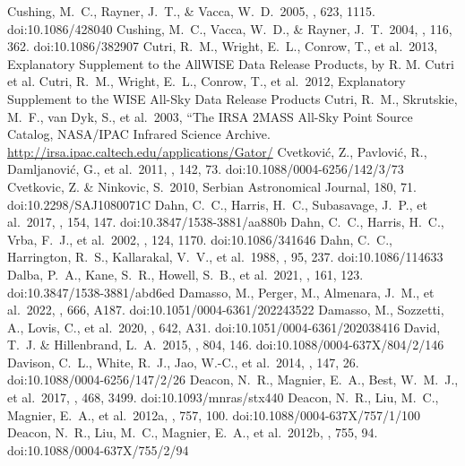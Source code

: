 \documentclass[twocolumn,tighten,twocolappendix]{aastex631}
\begin{document}
\begin{thebibliography}{}
 Cushing, M.~C., Rayner, J.~T., \& Vacca, W.~D.\ 2005, \apj, 623, 1115. doi:10.1086/428040
 Cushing, M.~C., Vacca, W.~D., \& Rayner, J.~T.\ 2004, \pasp, 116, 362. doi:10.1086/382907
 Cutri, R.~M., Wright, E.~L., Conrow, T., et al.\ 2013, Explanatory Supplement to the AllWISE Data Release Products, by R. M. Cutri et al.
 Cutri, R.~M., Wright, E.~L., Conrow, T., et al.\ 2012, Explanatory Supplement to the WISE All-Sky Data Release Products
 Cutri, R.~M., Skrutskie, M.~F., van Dyk, S., et al.\ 2003, ``The IRSA 2MASS All-Sky Point Source Catalog, NASA/IPAC Infrared Science Archive. \url{http://irsa.ipac.caltech.edu/applications/Gator/}
 Cvetkovi{\'c}, Z., Pavlovi{\'c}, R., Damljanovi{\'c}, G., et al.\ 2011, \aj, 142, 73. doi:10.1088/0004-6256/142/3/73
 Cvetkovic, Z. \& Ninkovic, S.\ 2010, Serbian Astronomical Journal, 180, 71. doi:10.2298/SAJ1080071C
 Dahn, C.~C., Harris, H.~C., Subasavage, J.~P., et al.\ 2017, \aj, 154, 147. doi:10.3847/1538-3881/aa880b
 Dahn, C.~C., Harris, H.~C., Vrba, F.~J., et al.\ 2002, \aj, 124, 1170. doi:10.1086/341646
 Dahn, C.~C., Harrington, R.~S., Kallarakal, V.~V., et al.\ 1988, \aj, 95, 237. doi:10.1086/114633
 Dalba, P.~A., Kane, S.~R., Howell, S.~B., et al.\ 2021, \aj, 161, 123. doi:10.3847/1538-3881/abd6ed
 Damasso, M., Perger, M., Almenara, J.~M., et al.\ 2022, \aap, 666, A187. doi:10.1051/0004-6361/202243522
 Damasso, M., Sozzetti, A., Lovis, C., et al.\ 2020, \aap, 642, A31. doi:10.1051/0004-6361/202038416
 David, T.~J. \& Hillenbrand, L.~A.\ 2015, \apj, 804, 146. doi:10.1088/0004-637X/804/2/146
 Davison, C.~L., White, R.~J., Jao, W.-C., et al.\ 2014, \aj, 147, 26. doi:10.1088/0004-6256/147/2/26
 Deacon, N.~R., Magnier, E.~A., Best, W.~M.~J., et al.\ 2017, \mnras, 468, 3499. doi:10.1093/mnras/stx440
 Deacon, N.~R., Liu, M.~C., Magnier, E.~A., et al.\ 2012a, \apj, 757, 100. doi:10.1088/0004-637X/757/1/100
 Deacon, N.~R., Liu, M.~C., Magnier, E.~A., et al.\ 2012b, \apj, 755, 94. doi:10.1088/0004-637X/755/2/94

\end{thebibliography}
\end{document}
